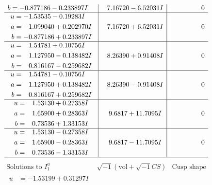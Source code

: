 \documentclass[1p]{elsarticle_modified}
\theoremstyle{definition}
\newcommand{\I}{\sqrt{-1}}
\begin{document}
$$\begin{array}{c|c|c}
\begin{aligned}
b &= -0.877186 - 0.233897 I\end{aligned}
 & \phantom{-}7.16720 - 6.52031 I & \phantom{-0.000000 } 0 \\ \hline\begin{aligned}
u &= -1.53535 - 0.19283 I \\
a &= -1.099040 + 0.202970 I \\
b &= -0.877186 + 0.233897 I\end{aligned}
 & \phantom{-}7.16720 + 6.52031 I & \phantom{-0.000000 } 0 \\ \hline\begin{aligned}
u &= \phantom{-}1.54781 + 0.10756 I \\
a &= \phantom{-}1.127950 - 0.138482 I \\
b &= \phantom{-}0.816167 - 0.259682 I\end{aligned}
 & \phantom{-}8.26390 + 0.91408 I & \phantom{-0.000000 } 0 \\ \hline\begin{aligned}
u &= \phantom{-}1.54781 - 0.10756 I \\
a &= \phantom{-}1.127950 + 0.138482 I \\
b &= \phantom{-}0.816167 + 0.259682 I\end{aligned}
 & \phantom{-}8.26390 - 0.91408 I & \phantom{-0.000000 } 0 \\ \hline\begin{aligned}
u &= \phantom{-}1.53130 + 0.27358 I \\
a &= \phantom{-}1.65900 + 0.28363 I \\
b &= \phantom{-}0.73536 + 1.33153 I\end{aligned}
 & \phantom{-}9.6817 + 11.7095 I & \phantom{-0.000000 } 0 \\ \hline\begin{aligned}
u &= \phantom{-}1.53130 - 0.27358 I \\
a &= \phantom{-}1.65900 - 0.28363 I \\
b &= \phantom{-}0.73536 - 1.33153 I\end{aligned}
 & \phantom{-}9.6817 - 11.7095 I & \phantom{-0.000000 } 0\\
 \hline 
 \end{array}$$\newpage$$\begin{array}{c|c|c}  
\text{Solutions to }I^u_{1}& \I (\text{vol} + \sqrt{-1}CS) & \text{Cusp shape}\\
 \hline 
\begin{aligned}
u &= -1.53199 + 0.31297 I \\

\end{aligned}
\end{array}$$
\end{document}
